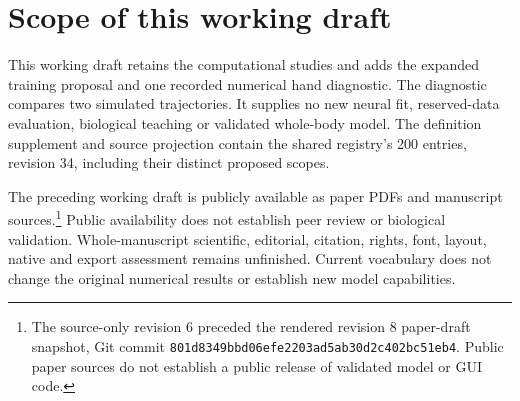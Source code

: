 \section*{Scope of this working draft}
This working draft retains the computational studies and adds the expanded
training proposal and one recorded numerical hand diagnostic. The diagnostic
compares two simulated trajectories. It supplies no new neural fit,
reserved-data evaluation, biological teaching or validated whole-body model.
The definition supplement and source projection contain the shared registry's
200 entries, revision 34, including their distinct proposed scopes.

The preceding working draft is publicly available as paper PDFs and manuscript
sources.\footnote{The source-only revision 6 preceded the rendered revision 8
paper-draft snapshot, Git commit
\nolinkurl{801d8349bbd06efe2203ad5ab30d2c402bc51eb4}. Public paper sources do not
establish a public release of validated model or GUI code.}
Public availability does not establish peer review or biological validation.
Whole-manuscript scientific, editorial, citation, rights, font, layout, native
and export assessment remains unfinished. Current vocabulary does not change
the original numerical results or establish new model capabilities.
